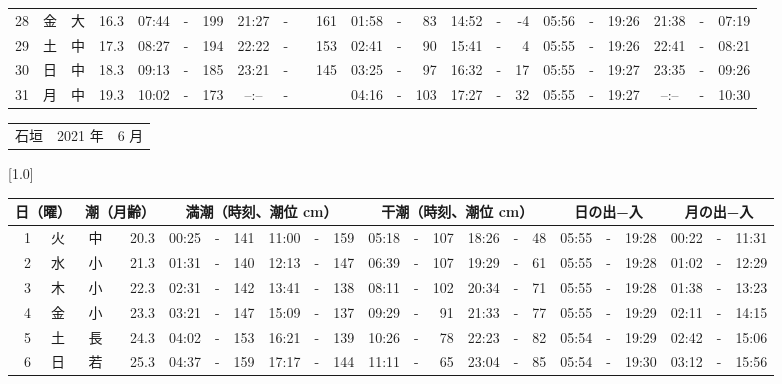 \documentclass[12pt,a4j]{jsarticle}
\begin{document}
\begin{table}[htbp]
\begin{center}
{\begin{tabular}{|rc|cr|ccrccr|ccrccr|ccc|ccc|}
28 & 金 & 大 & 16.3 &  07:44 &-& 199 &  21:27 &-& 161 &  01:58 &-&  83 &  14:52 &-&  -4 & 05:56 & -& 19:26 & 21:38 & -& 07:19 \\
29 & 土 & 中 & 17.3 &  08:27 &-& 194 &  22:22 &-& 153 &  02:41 &-&  90 &  15:41 &-&   4 & 05:55 & -& 19:26 & 22:41 & -& 08:21 \\
30 & 日 & 中 & 18.3 &  09:13 &-& 185 &  23:21 &-& 145 &  03:25 &-&  97 &  16:32 &-&  17 & 05:55 & -& 19:27 & 23:35 & -& 09:26 \\
31 & 月 & 中 & 19.3 &  10:02 &-& 173 &  --:-- &-&~~~~~ &  04:16 &-& 103 &  17:27 &-&  32 & 05:55 & -& 19:27 & --:-- & -& 10:30 \\
   \hline
   \end{tabular}}
   \end{center}
\end{table}
\newpage
 \begin{table}[htbp]
 \begin{center}
 \begin{tabular}{lcc}
 \LARGE{石垣}  & \large{2021 年} & \large{ 6 月} \\
 \end{tabular}
 \end{center}
 \begin{center}
    \scalebox{0.7}[1.0]{
    \begin{tabular}{|rc|cr|ccrccr|ccrccr|ccc|ccc|}
    \hline
    \multicolumn{2}{|c|}{日（曜）} & \multicolumn{2}{c|}{潮（月齢）} & \multicolumn{6}{c|}{満潮（時刻、潮位 cm）} & \multicolumn{6}{c|}{干潮（時刻、潮位 cm）} & \multicolumn{3}{c|}{日の出−入} &  \multicolumn{3}{c|}{月の出−入}\\
 \hline
 1 & 火 & 中 & 20.3 &  00:25 &-& 141 &  11:00 &-& 159 &  05:18 &-& 107 &  18:26 &-&  48 & 05:55 & -& 19:28 & 00:22 & -& 11:31 \\
 2 & 水 & 小 & 21.3 &  01:31 &-& 140 &  12:13 &-& 147 &  06:39 &-& 107 &  19:29 &-&  61 & 05:55 & -& 19:28 & 01:02 & -& 12:29 \\
 3 & 木 & 小 & 22.3 &  02:31 &-& 142 &  13:41 &-& 138 &  08:11 &-& 102 &  20:34 &-&  71 & 05:55 & -& 19:28 & 01:38 & -& 13:23 \\
 4 & 金 & 小 & 23.3 &  03:21 &-& 147 &  15:09 &-& 137 &  09:29 &-&  91 &  21:33 &-&  77 & 05:55 & -& 19:29 & 02:11 & -& 14:15 \\
 5 & 土 & 長 & 24.3 &  04:02 &-& 153 &  16:21 &-& 139 &  10:26 &-&  78 &  22:23 &-&  82 & 05:54 & -& 19:29 & 02:42 & -& 15:06 \\
 6 & 日 & 若 & 25.3 &  04:37 &-& 159 &  17:17 &-& 144 &  11:11 &-&  65 &  23:04 &-&  85 & 05:54 & -& 19:30 & 03:12 & -& 15:56 \\

\end{tabular}}
\end{center}
\end{table}
\end{document}
